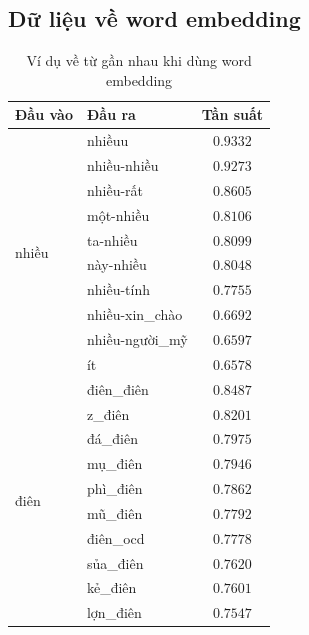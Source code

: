 \subsection*{Dữ liệu về word embedding}
\begin{table}[htb]
    \centering
    \caption{Ví dụ về từ gần nhau khi dùng word embedding}
    \label{table:fasttext-mostsimilar}
    \begin{tabular}{l l c}
        \toprule
        \textbf{Đầu vào}        & \textbf{Đầu ra} & \textbf{Tần suất} \\\midrule
        \multirow{10}{*}{nhiều} & nhiềuu          & $0.9332$          \\
                                & nhiều-nhiều     & $0.9273$          \\
                                & nhiều-rất       & $0.8605$          \\
                                & một-nhiều       & $0.8106$          \\
                                & ta-nhiều        & $0.8099$          \\
                                & này-nhiều       & $0.8048$          \\
                                & nhiều-tính      & $0.7755$          \\
                                & nhiều-xin\_chào & $0.6692$          \\
                                & nhiều-người\_mỹ & $0.6597$          \\
                                & ít              & $0.6578$          \\\midrule
        \multirow{10}{*}{điên}  & điên\_điên      & $0.8487$          \\
                                & z\_điên         & $0.8201$          \\
                                & đá\_điên        & $0.7975$          \\
                                & mụ\_điên        & $0.7946$          \\
                                & phì\_điên       & $0.7862$          \\
                                & mũ\_điên        & $0.7792$          \\
                                & điên\_ocd       & $0.7778$          \\
                                & sủa\_điên       & $0.7620$          \\
                                & kẻ\_điên        & $0.7601$          \\
                                & lợn\_điên       & $0.7547$          \\
        \bottomrule
    \end{tabular}
\end{table}

